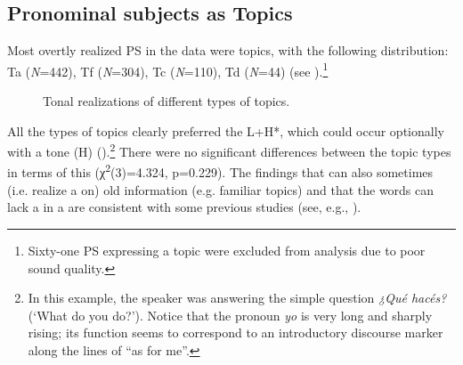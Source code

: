 \documentclass[output=paper]{langsci/langscibook}
\begin{document}
\subsection{Pronominal subjects as Topics} 
\label{sec:pes:4.2}
Most overtly realized PS in the data were topics, with the following distribution: Ta (\textit{N}=442), Tf (\textit{N}=304), Tc (\textit{N}=110), Td (\textit{N}=44) (see ).\footnote{Sixty-one PS expressing a topic were excluded from analysis due to poor sound quality.}\largerpage[-1]

\begin{figure}
\caption{Tonal realizations of different types of topics.\label{fig:pes:13}} 
\end{figure}

All the types of topics clearly preferred the  L+H*, which could occur optionally with a  tone (H\textminus{}) ().\footnote{In this example, the speaker was answering the simple question \textit{¿Qué hacés?} (‘What do you do?’). Notice that the pronoun \textit{yo} is very long and sharply rising; its function seems to correspond to an introductory discourse marker along the lines of ``as for me''.} There were no significant differences between the topic types in terms of this  (χ\textsuperscript{2}(3)=4.324, p=0.229). The findings that  can also sometimes  (i.e. realize a  on) old information (e.g. familiar topics) and that the words can lack a  in a  are consistent with some previous studies (see, e.g., \citealt{Cruttenden1993,Face2003}).
\end{document}
